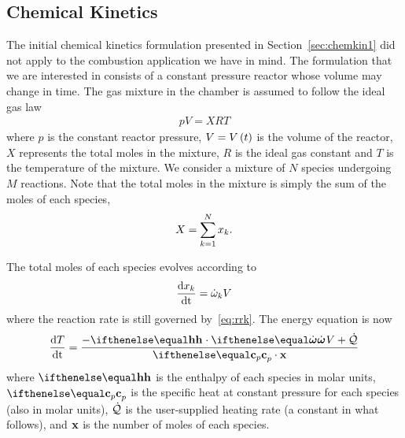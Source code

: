 \documentclass[fontsize=12pt, %
               paper=a4, %
               hyperref]{report}
\begin{document}
  \subsection{Chemical Kinetics} \label{sec:chemkin2}
  The initial chemical kinetics formulation presented in Section~\ref{sec:chemkin1} 
  did not apply to the combustion application we have in mind.  
  The formulation that we are interested in consists of a constant 
  pressure reactor whose volume may change in time.  The gas mixture 
  in the chamber is assumed to follow the ideal gas law 
  \begin{align}
    pV = X R T \label{eq:ideal_gas_law}
  \end{align}
  where $p$ is the constant reactor pressure, $V = V\left(t\right)$ is 
  the volume of the reactor, $X$ represents the total moles in 
  the mixture, $R$ is the ideal gas constant and $T$ is the 
  temperature of the mixture.  We consider a mixture of $N$ 
  species undergoing $M$ reactions.  Note that the total 
  moles in the mixture is simply the sum of the moles of each 
  species, 
  \begin{align}
    X = \sum_{k=1}^{N}{x_{k}}.
  \end{align}
  
  The total moles of each species evolves according to 
  \begin{align}
    \frac{\mathrm{d} x_{k}}{\mathrm{d} \mathrm{t}} = \dot{\omega}_{k}V
  \end{align}
  where the reaction rate is still governed by~\eqref{eq:rrk}.
  The energy equation is now 
  \begin{align}
    \odeone{T}{\time} = \frac{-\enth\cdot\rr V + \heating}{\cp\cdot\x}
  \end{align}
  where $\enth$ is the enthalpy of each species in molar units, 
  $\cp$ is the specific heat at constant pressure for each 
  species (also in molar units), $\dot{\mathcal{Q}}$ 
  is the user-supplied heating rate (a constant in what follows), 
  and $\mathbf{x}$ is the number of moles of each species. 

  
\end{document}
